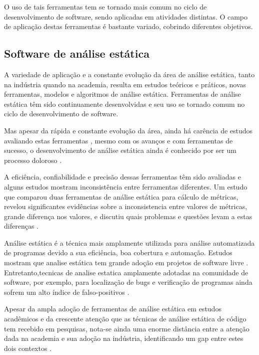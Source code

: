 O uso de tais ferramentas tem se tornado mais comum no ciclo de desenvolvimento de
software, sendo aplicadas em atividades distintas.
O campo de aplicação destas ferramentas é bastante variado, cobrindo diferentes
objetivos.

\subsection{Software de análise estática}

A variedade de aplicação e a constante evolução da área de análise estática, 
tanto na indústria quando na academia, resulta em  estudos teóricos e práticos, novas ferramentas, modelos e
algoritmos de análise estática. Ferramentas de análise estática têm sido
continuamente desenvolvidas e seu uso se tornado comum no ciclo de desenvolvimento de
software.

Mas apesar da rápida e constante evolução da área, ainda há carência de estudos
avaliando estas ferramentas \cite{li2010comparative}, mesmo com os avanços e com
ferramentas de sucesso, o desenvolvimento de análise estática ainda é conhecido
por ser um processo doloroso \cite{toman2017taming}.

A eficiência, confiabilidade e precisão dessas ferramentas têm sido avaliadas e
alguns estudos mostram inconsistência entre ferramentas diferentes.
Um estudo que comparou duas ferramentas de análise estática para cálculo de métricas,
revelou significantes evidências sobre a inconsistencia entre valores de métricas,
grande diferença nos valores, e discutiu quais problemas e questões levam a estas
diferenças \cite{alemerien2013experimental}.

Análise estática é a técnica mais amplamente utilizada para análise
automatizada de programas devido a sua eficiência, boa cobertura e automação.
Estudos mostram que analise estática tem grande adoção em projetos de software
livre \cite{beller2016analyzing}.
Entretanto,tecnicas de analise estatica amplamente adotadas na comunidade de software,
por exemplo, para localização de bugs e verificação de programas 
ainda sofrem um alto índice de falso-positivos \cite{gosain2015static}.

Apesar da ampla adoção de ferramentas de análise estática em estudos
acadêmicos e da crescente atenção que as técnicas de análise estática de código tem
recebido em pesquisas, nota-se ainda uma enorme distância entre a atenção dada na academia e sua adoção na indústria,
identificando um gap entre estes dois contextos \cite{ilyas2016static}.

